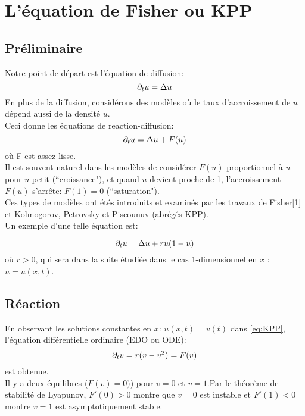 

\section{L'équation de Fisher ou KPP}
\subsection{Préliminaire}
Notre point de départ est l'équation de diffusion:\begin{equation}\partial_t u = \Delta u  \end{equation}
En plus de la diffusion, considérons des modèles où le taux d'accroissement de $u$ dépend aussi de la densité $u$.\\
Ceci donne les équations de reaction-diffusion:
\begin{equation}\partial_t u = \Delta u + F(u) \label{eq:ReaDi} \end{equation} 
où F est assez lisse.\\
Il est souvent naturel dans les modèles de considérer $F(u)$ proportionnel à  $u$ pour $u$ petit (``croissance"), et quand $u$ devient proche de 1, l'accroissement $F(u)$ s'arrête: $F(1)=0$ (``saturation").\\
Ces types de modèles ont étés introduits et examinés par les travaux de Fisher[1] %
et Kolmogorov, Petrovsky et Piscounuv (abrégés KPP).\\ %
Un exemple d'une telle équation est:

\begin{equation}
	\partial_t u = \Delta u + ru(1-u) \label{eq:KPP}
\end{equation}
où $r>0$, qui sera dans la suite étudiée dans le cas 1-dimensionnel en $x$ : $u=u(x,t)$.

\subsection{Réaction}
En observant les solutions constantes en $x$: $u(x,t)=v(t)$ dans \eqref{eq:KPP}, l'équation différentielle ordinaire (EDO ou ODE): \begin{equation}
	\partial_t v = r(v - v^2) = F(v)
\end{equation}
est obtenue. \\
Il y a deux équilibres ($F(v)=0)$) pour $v=0$ et $v=1$.Par le théorème de stabilité de Lyapunov, $F'(0)>0$ montre que $v=0$ est instable et $F'(1)<0$ montre $v=1$ est asymptotiquement stable.

